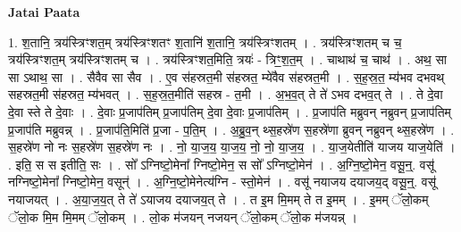 \documentclass[17pt]{extarticle}
\begin{document}
\textbf{Jatai Paata} \newline

1. श॒तानि॒ त्रय॑स्त्रिꣳशत॒म् त्रय॑स्त्रिꣳशतꣳ श॒तानि॑ श॒तानि॒ त्रय॑स्त्रिꣳशतम् । . त्रय॑स्त्रिꣳशतम् च च॒ त्रय॑स्त्रिꣳशत॒म् त्रय॑स्त्रिꣳशतम् च । . त्रय॑स्त्रिꣳशत॒मिति॒ त्रयः॑ - त्रिꣳ॒॒श॒त॒म् । . चाथाथ॑ च॒ चाथ॑ । . अथ॒ सा सा ऽथाथ॒ सा । . सैवैव सा सैव । . ए॒व स॑हस्रत॒मी स॑हस्रत॒ म्ये॑वैव स॑हस्रत॒मी । . स॒ह॒स्र॒त॒ म्य॑भव दभवथ् सहस्रत॒मी स॑हस्रत॒ म्य॑भवत् । . स॒ह॒स्र॒त॒मीति॑ सहस्र - त॒मी । . अ॒भ॒व॒त् ते ते॑ ऽभव दभव॒त् ते । . ते दे॒वा दे॒वा स्ते ते दे॒वाः । . दे॒वाः प्र॒जाप॑तिम् प्र॒जाप॑तिम् दे॒वा दे॒वाः प्र॒जाप॑तिम् । . प्र॒जाप॑ति मब्रुवन् नब्रुवन् प्र॒जाप॑तिम् प्र॒जाप॑ति मब्रुवन्न् । . प्र॒जाप॑ति॒मिति॑ प्र॒जा - प॒ति॒म् । . अ॒ब्रु॒व॒न् थ्स॒हस्रे॑ण स॒हस्रे॑णा ब्रुवन् नब्रुवन् थ्स॒हस्रे॑ण । . स॒हस्रे॑ण नो नः स॒हस्रे॑ण स॒हस्रे॑ण नः । . नो॒ या॒ज॒य॒ या॒ज॒य॒ नो॒ नो॒ या॒ज॒य॒ । . या॒ज॒येतीति॑ याजय याज॒येति॑ । . इति॒ स स इतीति॒ सः । . सो᳚ ऽग्निष्टो॒मेना᳚ ग्निष्टो॒मेन॒ स सो᳚ ऽग्निष्टो॒मेन॑ । . अ॒ग्नि॒ष्टो॒मेन॒ वसू॒न्॒. वसू॑ नग्निष्टो॒मेना᳚ ग्निष्टो॒मेन॒ वसून्॑ । . अ॒ग्नि॒ष्टो॒मेनेत्य॑ग्नि - स्तो॒मेन॑ । . वसू॑ नयाजय दयाजय॒द् वसू॒न्॒. वसू॑ नयाजयत् । . अ॒या॒ज॒य॒त् ते ते॑ ऽयाजय दयाजय॒त् ते । . त इ॒म मि॒मम् ते त इ॒मम् । . इ॒मम् ॅलो॒कम् ॅलो॒क मि॒म मि॒मम् ॅलो॒कम् । . लो॒क म॑जयन् नजयन् ॅलो॒कम् ॅलो॒क म॑जयन्न् । \newline
\end{document}

